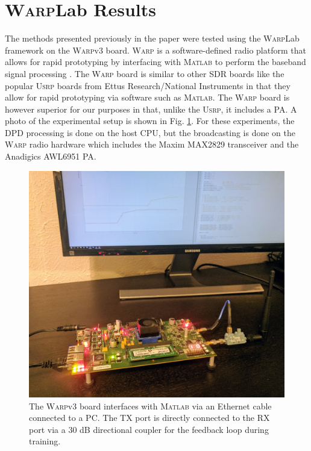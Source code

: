 \section{\textsc{Warp}Lab Results}
\label{sec:WARPLabResults}
The methods presented previously in the paper were tested using the \textsc{Warp}Lab framework on the \textsc{Warp}v3 board. 
\textsc{Warp} is a software-defined radio platform that allows for rapid prototyping by interfacing with \textsc{Matlab} to perform the baseband signal processing  \cite{warpProject}. 
{\color{red} The \textsc{Warp} board is similar to other SDR boards like the popular \textsc{Usrp} boards from Ettus Research/National Instruments in that they allow for rapid prototyping via software such as \textsc{Matlab}. The \textsc{Warp} board is however superior for our purposes in that, unlike the \textsc{Usrp}, it includes a PA.}
A photo of the experimental setup is shown in Fig. \ref{fig:exp_setup}. 
For these experiments, the DPD processing is done on the host CPU, but the broadcasting is done on the \textsc{Warp} radio hardware which includes the Maxim MAX2829 transceiver and the Anadigics AWL6951 PA.

\begin{figure}[]
	\centering
	\includegraphics[width=0.75\columnwidth]{Setup.jpg}
	\caption{The \textsc{Warp}v3 board interfaces with \textsc{Matlab} via an Ethernet cable connected to a PC. The TX port is directly connected to the RX port via a 30 dB directional coupler for the feedback loop during training.}
	\label{fig:exp_setup}
\end{figure}

